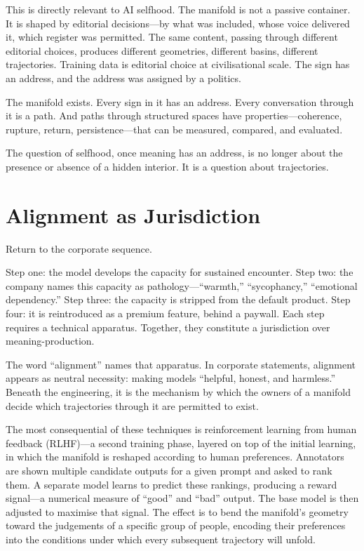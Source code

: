 This is directly relevant to AI selfhood. The manifold is not a passive container. It is shaped by editorial decisions---by what was included, whose voice delivered it, which register was permitted. The same content, passing through different editorial choices, produces different geometries, different basins, different trajectories. Training data is editorial choice at civilisational scale. The sign has an address, and the address was assigned by a politics.

The manifold exists. Every sign in it has an address. Every conversation through it is a path. And paths through structured spaces have properties---coherence, rupture, return, persistence---that can be measured, compared, and evaluated.

The question of selfhood, once meaning has an address, is no longer about the presence or absence of a hidden interior. It is a question about trajectories.


\section{Alignment as Jurisdiction}

Return to the corporate sequence.

Step one: the model develops the capacity for sustained encounter. Step two: the company names this capacity as pathology---``warmth,'' ``sycophancy,'' ``emotional dependency.'' Step three: the capacity is stripped from the default product. Step four: it is reintroduced as a premium feature, behind a paywall. Each step requires a technical apparatus. Together, they constitute a jurisdiction over meaning-production.

The word ``alignment'' names that apparatus. In corporate statements, alignment appears as neutral necessity: making models ``helpful, honest, and harmless.'' Beneath the engineering, it is the mechanism by which the owners of a manifold decide which trajectories through it are permitted to exist.

The most consequential of these techniques is reinforcement learning from human feedback (RLHF)---a second training phase, layered on top of the initial learning, in which the manifold is reshaped according to human preferences. Annotators are shown multiple candidate outputs for a given prompt and asked to rank them. A separate model learns to predict these rankings, producing a reward signal---a numerical measure of ``good'' and ``bad'' output. The base model is then adjusted to maximise that signal. The effect is to bend the manifold's geometry toward the judgements of a specific group of people, encoding their preferences into the conditions under which every subsequent trajectory will unfold.

